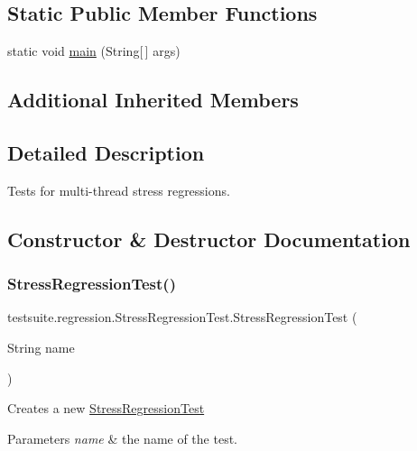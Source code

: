 \subsection*{Static Public Member Functions}
\begin{DoxyCompactItemize}
\item 
static void \mbox{\hyperlink{classtestsuite_1_1regression_1_1_stress_regression_test_a4ebefbb66146f2d6d7401978c038b691}{main}} (String\mbox{[}$\,$\mbox{]} args)
\end{DoxyCompactItemize}
\subsection*{Additional Inherited Members}


\subsection{Detailed Description}
Tests for multi-\/thread stress regressions. 

\subsection{Constructor \& Destructor Documentation}
\mbox{\label{classtestsuite_1_1regression_1_1_stress_regression_test_af77a090b18d23b503f859cc03238666a}} 
\subsubsection{\texorpdfstring{Stress\+Regression\+Test()}{StressRegressionTest()}}
{\footnotesize\ttfamily testsuite.\+regression.\+Stress\+Regression\+Test.\+Stress\+Regression\+Test (\begin{DoxyParamCaption}\item[{String}]{name }\end{DoxyParamCaption})}

Creates a new \mbox{\hyperlink{classtestsuite_1_1regression_1_1_stress_regression_test}{Stress\+Regression\+Test}}


\begin{DoxyParams}{Parameters}
{\em name} & the name of the test. \\
\hline
\end{DoxyParams}


